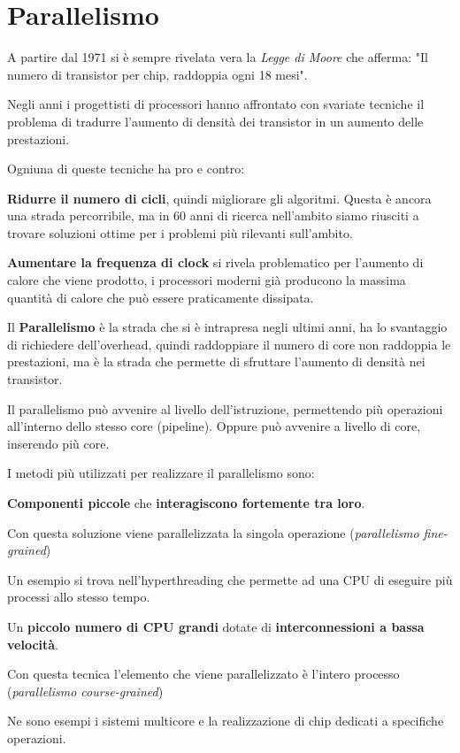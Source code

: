 \section{Parallelismo}
A partire dal 1971 si è sempre rivelata vera la \textit{Legge di Moore} che afferma: "Il numero di transistor per chip, raddoppia ogni 18 mesi".

\spacer
Negli anni i progettisti di processori hanno affrontato con svariate tecniche il problema di tradurre l'aumento di densità dei transistor in un aumento delle prestazioni.

Ogniuna di queste tecniche ha pro e contro:
\spacer
\begin{sitemize}
    \item \textbf{Ridurre il numero di cicli}, quindi migliorare gli algoritmi. Questa è ancora una strada percorribile, ma in 60 anni di ricerca nell'ambito siamo riusciti a trovare soluzioni ottime per i problemi più rilevanti sull'ambito.
    \item \textbf{Aumentare la frequenza di clock} si rivela problematico per l'aumento di calore che viene prodotto, i processori moderni già producono la massima quantità di calore che può essere praticamente dissipata.
    \item Il \textbf{Parallelismo} è la strada che si è intrapresa negli ultimi anni, ha lo svantaggio di richiedere dell'overhead, quindi raddoppiare il numero di core non raddoppia le prestazioni, ma è la strada che permette di sfruttare l'aumento di densità nei transistor.

    Il parallelismo può avvenire al livello dell'istruzione, permettendo più operazioni all'interno dello stesso core (pipeline). Oppure può avvenire a livello di core, inserendo più core.
\end{sitemize}

\spacer
I metodi più utilizzati per realizzare il parallelismo sono:

\spacer
\begin{sitemize}
    \item \textbf{Componenti piccole} che \textbf{interagiscono fortemente tra loro}.

    Con questa soluzione viene parallelizzata la singola operazione (\textit{parallelismo fine-grained})

    Un esempio si trova nell'hyperthreading che permette ad una CPU di eseguire più processi allo stesso tempo.

    \item Un \textbf{piccolo numero di CPU grandi} dotate di \textbf{interconnessioni a bassa velocità}.

    Con questa tecnica l'elemento che viene parallelizzato è l'intero processo  (\textit{parallelismo course-grained})

    Ne sono esempi i sistemi multicore e la realizzazione di chip dedicati a specifiche operazioni.

\end{sitemize}

